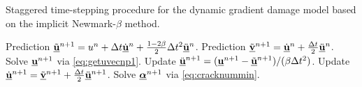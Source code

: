 \begin{algorithm}[htbp]
\caption{Staggered time-stepping procedure for the dynamic gradient damage model based on the implicit Newmark-$\beta$ method.} \label{algo:implicit}
\begin{algorithmic}[1]\linespread{1.2}\selectfont\normalsize
{}
  \State Prediction $\tilde{\uvec}^{n+1}=u^n+\Delta t\dot{\uvec}^n+\frac{1-2\beta}{2}\Delta t^2\ddot{\uvec}^n$.
  \State Prediction $\tilde{\underline{\vec{v}}}^{n+1}=\dot{\uvec}^n+\frac{\Delta t}{2}\ddot{\uvec}^n$.
  \State Solve $\uvec^{n+1}$ via \eqref{eq:getuvecnp1}.
  \State Update $\ddot{\uvec}^{n+1}=(\uvec^{n+1}-\tilde{\uvec}^{n+1})/(\beta\Delta t^2)$.
  \State Update $\dot{\uvec}^{n+1}=\tilde{\underline{\vec{v}}}^{n+1}+\frac{\Delta t}{2}\ddot{\uvec}^{n+1}$.
  \State Solve $\dvec^{n+1}$ via \eqref{eq:cracknummin}.
\EndFor
\end{algorithmic}
\end{algorithm}

